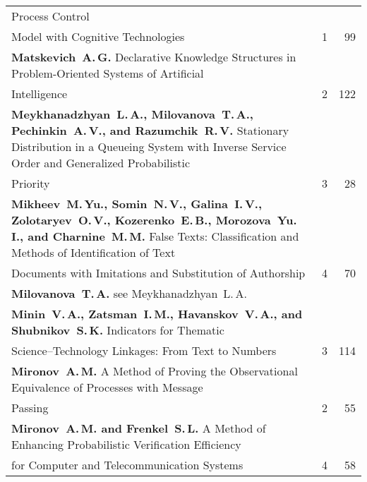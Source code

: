 {\begin{tabular}{p{397pt}rr}
Process Control\linebreak
\vspace*{-12pt}\\
\hspace*{23pt}Model with Cognitive Technologies\dotfill&1&99\\
\textbf{Matskevich~A.\,G.} Declarative Knowledge Structures in Problem-Oriented Systems of
Artificial\linebreak
\vspace*{-12pt}\\
\hspace*{23pt}Intelligence\dotfill&2&122\\
\hangindent=23pt\noindent\textbf{Meykhanadzhyan~L.\,A., Milovanova~T.\,A., Pechinkin~A.\,V., and Razumchik~R.\,V.}
Stationary Distribution in a Queueing System with Inverse Service Order and Generalized
Probabilistic\linebreak
\vspace*{-12pt}\\
\hspace*{23pt}Priority\dotfill&3&28\\
\hangindent=23pt\noindent\textbf{Mikheev~M.\,Yu., Somin~N.\,V., Galina~I.\,V., Zolotaryev~O.\,V., Kozerenko~E.\,B.,
Morozova~Yu.\,I., and Charnine~M.\,M.} False Texts: Classification and Methods of
Identification of Text\linebreak
\vspace*{-12pt}\\
\hspace*{23pt}Documents with Imitations  and Substitution of Authorship\dotfill&4&70\\
\textbf{Milovanova~T.\,A.} see Meykhanadzhyan~L.\,A.&&\\
\textbf{Minin~V.\,A., Zatsman~I.\,M., Havanskov~V.\,A., and Shubnikov~S.\,K.} Indicators for
Thematic\linebreak
\vspace*{-12pt}\\
\hspace*{23pt}Science--Technology Linkages: From Text to Numbers\dotfill&3&114\\
\textbf{Mironov~A.\,M.} A Method of Proving the Observational Equivalence of Processes with
Message\linebreak
\vspace*{-12pt}\\
\hspace*{23pt}Passing\dotfill&2&55\\
\textbf{Mironov~A.\,M. and Frenkel~S.\,L.} A Method of Enhancing Probabilistic Verification
Efficiency\linebreak
\vspace*{-12pt}\\
\hspace*{23pt}for Computer and Telecommunication Systems\dotfill&4&58\\
\end{tabular}
}
\pagebreak

